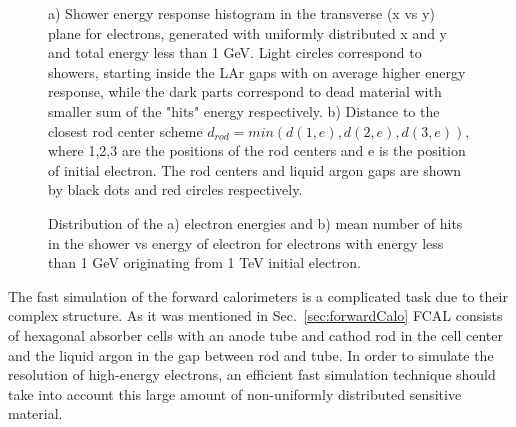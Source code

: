 \begin{figure}[!tbp]
\begin{minipage}[h]{0.49\linewidth}
\end{minipage}
\hfill
\begin{minipage}[h]{0.49\linewidth}
\end{minipage}
\caption{ a) Shower energy response histogram in the transverse (x vs y) plane for electrons, generated with uniformly distributed x and y and total energy less than 1 GeV. Light circles correspond to showers, starting inside the LAr gaps with on average higher energy response, while the dark parts correspond to dead material with smaller sum of the "hits" energy respectively.
b) Distance to the closest rod center scheme $d_{rod} = min( d(1,e), d(2, e), d(3, e))$, where 1,2,3 are the positions of the rod centers and e is the position of initial electron. The rod centers and liquid argon gaps are shown by black dots and red circles respectively.}
\label{fig:FSFluctuations}
\end{figure}


\begin{figure}[!tbp]
\begin{minipage}[h]{0.49\linewidth}
\end{minipage}
\hfill
\begin{minipage}[h]{0.49\linewidth}
\end{minipage}
\caption{Distribution  of the a) electron energies and b) mean number of hits in the shower vs energy of electron for electrons with energy less than 1 GeV originating from 1 TeV initial electron.}
\label{fig:TrackEnergy}
\end{figure}

The fast simulation of  the forward calorimeters is a complicated task due to their complex structure. As it was mentioned in Sec.~\ref{sec:forwardCalo} FCAL consists of hexagonal absorber cells with an anode tube and cathod rod in the cell center and the liquid argon in the gap between rod and tube. In order to simulate the resolution of high-energy electrons, an efficient fast simulation technique should take into account this large amount of non-uniformly distributed sensitive material.

